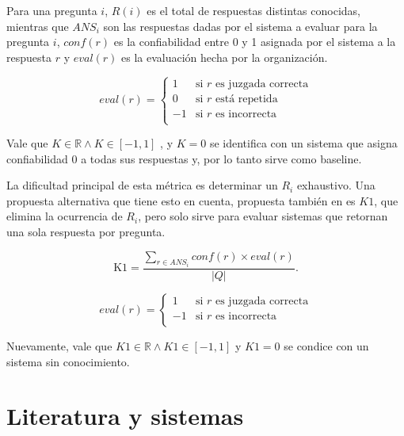 Para una pregunta $i$, $R(i)$ es el total de respuestas distintas conocidas, mientras que $ANS_i$ son las respuestas dadas por el sistema a evaluar para la pregunta $i$, $conf(r)$ es la confiabilidad entre 0 y 1 asignada por el sistema a la respuesta $r$ y $eval(r)$ es la evaluación hecha por la organización.


\begin{equation*}
    eval(r) = \begin{cases}
               1  & \text{si $r$ es juzgada correcta}\\
               0  & \text{si $r$ está repetida}\\
               -1 & \text{si $r$ es incorrecta}\\
           \end{cases}
\end{equation*}

Vale que $K \in \mathbb{R} \wedge  K \in [-1,1]$ , y $K=0$ se identifica con un sistema que asigna confiabilidad 0 a todas sus respuestas y, por lo tanto sirve como baseline.

La dificultad principal de esta métrica es determinar un $R_i$ exhaustivo. Una propuesta alternativa que tiene esto en cuenta, propuesta también en \cite{CLEF04} es $K1$, que elimina la ocurrencia de $R_i$, pero solo sirve para evaluar sistemas que retornan una sola respuesta por pregunta.

\begin{equation}\label{eq:k1}
 \text{K1} = \frac{\sum_{r \in ANS_i} conf(r) \times eval(r)}{|Q|}. \!
\end{equation}

\begin{equation*}
    eval(r) = \begin{cases}
               1  & \text{si $r$ es juzgada correcta}\\
               -1 & \text{si $r$ es incorrecta}\\
           \end{cases}
\end{equation*}

Nuevamente, vale que $K1 \in \mathbb{R} \wedge  K1 \in [-1,1]$ y $K1=0$ se condice con un sistema sin conocimiento.

\section{Literatura y sistemas}
\label{sec:literatura}

